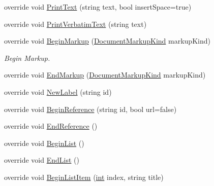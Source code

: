 \begin{DoxyCompactItemize}
override void \hyperlink{class_software_engineering_tools_1_1_documentation_1_1_word_generator_aeea13e32835b1af446a27f4ed4977c5a}{Print\+Text} (string text, bool insert\+Space=true)
\item 
override void \hyperlink{class_software_engineering_tools_1_1_documentation_1_1_word_generator_a888eb271c27f9419b29eb38cbd00af66}{Print\+Verbatim\+Text} (string text)
\item 
override void \hyperlink{class_software_engineering_tools_1_1_documentation_1_1_word_generator_a7606e1f460a2b58245d6dd1418058a11}{Begin\+Markup} (\hyperlink{namespace_software_engineering_tools_1_1_documentation_a4eed17ca0ed06a8b62b953b063f857d9}{Document\+Markup\+Kind} markup\+Kind)
\begin{DoxyCompactList}\small\item\em Begin Markup. \end{DoxyCompactList}\item 
override void \hyperlink{class_software_engineering_tools_1_1_documentation_1_1_word_generator_ac480b4e09794677ff4c3abce6455aa32}{End\+Markup} (\hyperlink{namespace_software_engineering_tools_1_1_documentation_a4eed17ca0ed06a8b62b953b063f857d9}{Document\+Markup\+Kind} markup\+Kind)
\item 
override void \hyperlink{class_software_engineering_tools_1_1_documentation_1_1_word_generator_abb9105e0709c711c7199faa29dbf9331}{New\+Label} (string id)
\item 
override void \hyperlink{class_software_engineering_tools_1_1_documentation_1_1_word_generator_acdb54490629705960c7544904a96f8b9}{Begin\+Reference} (string id, bool url=false)
\item 
override void \hyperlink{class_software_engineering_tools_1_1_documentation_1_1_word_generator_a7032d09ad0e77686dd17fd063bfd1c90}{End\+Reference} ()
\item 
override void \hyperlink{class_software_engineering_tools_1_1_documentation_1_1_word_generator_a8e6c89f64b72dc406aab016d39ee3c60}{Begin\+List} ()
\item 
override void \hyperlink{class_software_engineering_tools_1_1_documentation_1_1_word_generator_a254b01c1abbc805bce33d0827ca12988}{End\+List} ()
\item 
override void \hyperlink{class_software_engineering_tools_1_1_documentation_1_1_word_generator_a21cf3f4b0aabac4e3a64b0da78cd0212}{Begin\+List\+Item} (\hyperlink{namespace_software_engineering_tools_1_1_documentation_a4a8017aa254d1d05b03db5132b7dd3a7afa7153f7ed1cb6c0fcf2ffb2fac21748}{int} index, string title)

\end{DoxyCompactItemize}
